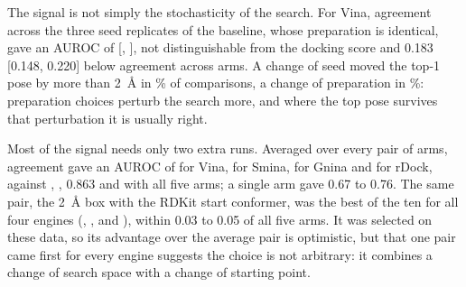 The signal is not simply the stochasticity of the search. For Vina, agreement across the
three seed replicates of the baseline, whose preparation is identical, gave an AUROC of
 [, ], not distinguishable from the docking score and 0.183 [0.148, 0.220]
below agreement across arms. A change of seed moved the top-1 pose by more than
\SI{2}{\angstrom} in \% of comparisons, a change of preparation in \%: preparation
choices perturb the search more, and where the top pose survives that perturbation it is
usually right.

Most of the signal needs only two extra runs. Averaged over every pair of arms, agreement
gave an AUROC of  for Vina,  for Smina,  for Gnina and  for rDock,
against , , 0.863 and  with all five arms; a single arm gave 0.67 to 0.76.
The same pair, the \SI{2}{\angstrom} box with the RDKit start conformer, was the best of the
ten for all four engines (, ,  and ), within 0.03 to 0.05 of all five
arms. It was selected on these data, so its advantage over the average pair is optimistic,
but that one pair came first for every engine suggests the choice is not arbitrary: it
combines a change of search space with a change of starting point.

